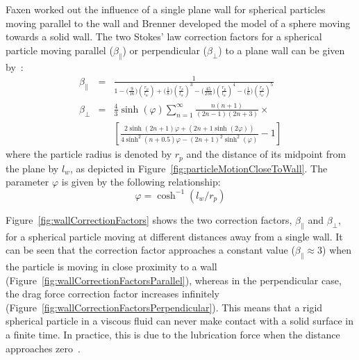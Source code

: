 Faxen worked out the influence of a single plane wall for spherical particles moving parallel to the wall and Brenner developed the model of a sphere moving towards a solid wall. The two Stokes' law correction factors for a spherical particle moving parallel ($\beta_{\parallel}$) or perpendicular ($\beta_{\perp}$) to a plane wall can be given by~\cite{Faxen1922,Brenner1961}:
\begin{eqnarray}
    \beta_{\parallel} &=& \frac{1}{1-\Big(\frac{9}{16}\Big)\left(\frac{r_{p}}{l_{w}}\right)+\Big(\frac{1}{8}\Big)\left(\frac{r_{p}}{l_{w}}\right)^{3}-\Big(\frac{45}{256}\Big)\left(\frac{r_{p}}{l_{w}}\right)^{4}-\Big(\frac{1}{6}\Big)\left(\frac{r_{p}}{l_{w}}\right)^{5}} \\
    \beta_{\perp} &=& \frac{4}{3} \sinh(\varphi) \sum_{n=1}^{\infty} \frac{n(n+1)}{(2n-1)(2n+3)} \times \\
     && \left[ \frac{2\sinh(2n+1)\varphi + (2n+1\sinh(2\varphi))}{4\sinh^{2}(n+0.5)\varphi-(2n+1)^{2}\sinh^{2}(\varphi)} -1\right] \nonumber
    \label{eqn:wallEffectCorrectionFactors}
\end{eqnarray}
where the particle radius is denoted by $r_{p}$ and the distance of its midpoint from the plane by $l_{w}$, as depicted in Figure~\ref{fig:particleMotionCloseToWall}. The parameter $\varphi$ is given by the following relationship:
\begin{equation}
     \varphi = \cosh^{-1}(l_{w}/r_{p})
     \label{eqn:radiusToDistanceToPlane}
\end{equation}

Figure~\ref{fig:wallCorrectionFactors} shows the two correction factors, $\beta_{\parallel}$ and $\beta_{\perp}$, for a spherical particle moving at different distances away from a single wall. It can be seen that the correction factor approaches a constant value ($\beta_{\parallel}\approx 3$) when the particle is moving in close proximity to a wall (Figure~\ref{fig:wallCorrectionFactorsParallel}), whereas in the perpendicular case, the drag force correction factor increases infinitely (Figure~\ref{fig:wallCorrectionFactorsPerpendicular}). This means that a rigid spherical particle in a viscous fluid can never make contact with a solid surface in a finite time. In practice, this is due to the lubrication force when the distance approaches zero~\cite{Brenner1961,Cox1967,Davis1986}.%

